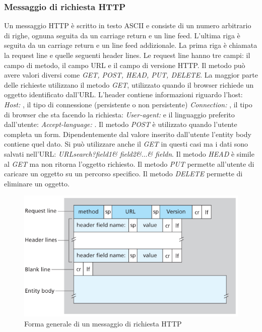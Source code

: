 \subsubsection{Messaggio di richiesta HTTP}
Un messaggio HTTP \`e scritto in testo ASCII e consiste di un numero arbitrario di righe, ognuna seguita da un carriage return e un line feed. L'ultima riga \`e seguita da un carriage return e un line feed 
addizionale. La prima riga \`e chiamata la request line e quelle seguenti header lines. Le request line hanno tre campi: il campo di metodo, il campo URL e il campo di versione HTTP. Il metodo pu\`o avere
valori diversi come \emph{GET, POST, HEAD, PUT, DELETE}. La maggior parte delle richieste utilizzano il metodo \emph{GET}, utilizzato quando il browser richiede un oggetto identificato dall'URL. L'header
contiene informazioni riguardo l'host: \emph{Host: }, il tipo di connessione (persistente o non persistente) \emph{Connection: }, il tipo di browser che sta facendo la richiesta: \emph{User-agent: } e il linguaggio
preferito dall'utente: \emph{Accept-language: }. Il metodo \emph{POST} \`e utilizzato quando l'utente completa un form. Dipendentemente dal valore inserito dall'utente l'entity body contiene quel dato. Si 
pu\`o utilizzare anche il \emph{GET} in questi casi ma i dati sono salvati nell'URL: \emph{URLsearch?field1\& field2\&$\dots$\& fieldn}. Il metodo \emph{HEAD} \`e simile al \emph{GET} ma non ritorna 
l'oggetto richiesto. Il metodo \emph{PUT} permette all'utente di caricare un oggetto su un percorso specifico. Il metodo \emph{DELETE} permette di eliminare un oggetto.
\begin{figure}
\includegraphics[width=\textwidth]{Pictures/HTTPRequestMessage.png}
\caption{Forma generale di un messaggio di richiesta HTTP}
\end{figure}
